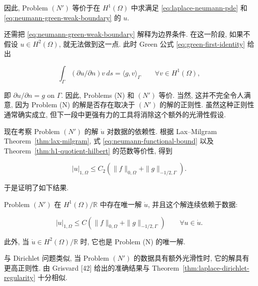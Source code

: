 因此, Problem $(N')$ 等价于在 $H^1(\Omega)$ 中求满足
\eqref{eq:laplace-neumann-pde} 和 \eqref{eq:neumann-green-weak-boundary} 的 $u$.

还需把 \eqref{eq:neumann-green-weak-boundary} 解释为边界条件. 在这一阶段, 如果不假设
$u\in H^2(\Omega)$, 就无法做到这一点. 此时 Green 公式
\eqref{eq:green-first-identity} 给出

\[
\int_\Gamma(\partial u/\partial n)v\,ds=\langle g,v\rangle_\Gamma\qquad\forall v\in H^1(\Omega),
\]

即 $\partial u/\partial n=g$ on $\Gamma$. 因此, Problems (N) 和 $(N')$ 等价. 当然, 这并不完全令人满意, 因为 Problem (N) 的解是否存在取决于 $(N')$ 的解的正则性. 虽然这种正则性通常确实成立, 但下一段中更强有力的工具将消除这个额外的光滑性假设.

现在考察 Problem $(N')$ 的解 $\dot u$ 对数据的依赖性. 根据 Lax--Milgram
Theorem~\ref{thm:lax-milgram}, 式 \eqref{eq:neumann-functional-bound} 以及
Theorem~\ref{thm:h1-quotient-hilbert} 的范数等价性, 得到

\[
|u|_{1,\Omega}\leq C_2(\|f\|_{0,\Omega}+\|g\|_{-1/2,\Gamma}).
\]

于是证明了如下结果.

\setcounter{statement}{1}
\renewcommand{\theHstatement}{proposition.\thesection.\arabic{statement}}
\begin{Proposition}\label{prop:laplace-neumann-wellposedness}
Problem $(N')$ 在 $H^1(\Omega)/\mathbb R$ 中存在唯一解 $\dot u$, 并且这个解连续依赖于数据:


\begin{equation}\label{eq:neumann-stability-h1}
|u|_{1,\Omega}\leq C(\|f\|_{0,\Omega}+\|g\|_{-1/2,\Gamma})\qquad\forall u\in\dot u.
\end{equation}

此外, 当 $\dot u\in H^2(\Omega)/\mathbb R$ 时, 它也是 Problem (N) 的唯一解.
\end{Proposition}

与 Dirichlet 问题类似, 当 Problem $(N')$ 的数据具有额外光滑性时, 它的解具有更高正则性.
由 Grisvard [42] 给出的准确结果与 Theorem~\ref{thm:laplace-dirichlet-regularity} 十分相似.

